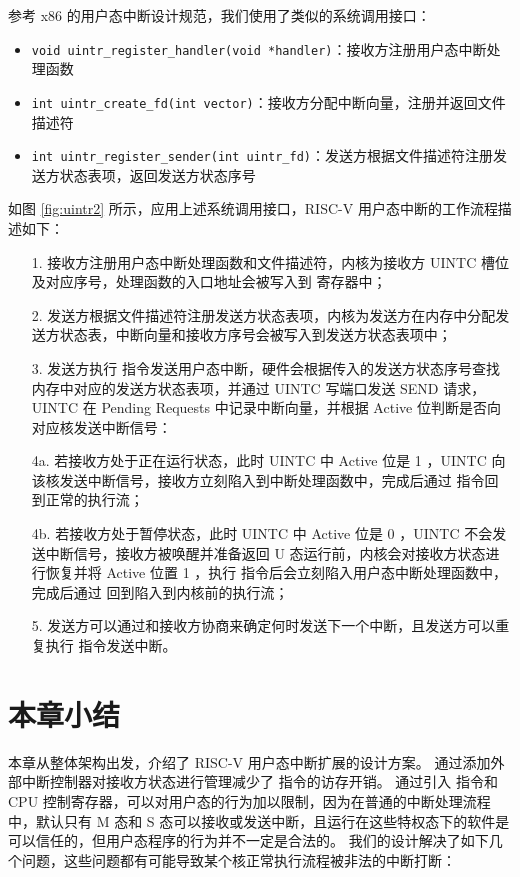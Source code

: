 参考 x86 的用户态中断设计规范\cite{x86uintr}，我们使用了类似的系统调用接口：

\begin{itemize}
    \item \texttt{void uintr_register_handler(void *handler)}：接收方注册用户态中断处理函数
    \item \texttt{int uintr_create_fd(int vector)}：接收方分配中断向量，注册并返回文件描述符
    \item \texttt{int uintr_register_sender(int uintr_fd)}：发送方根据文件描述符注册发送方状态表项，返回发送方状态序号
\end{itemize}

如图 \ref{fig:uintr2} 所示，应用上述系统调用接口，RISC-V 用户态中断的工作流程描述如下：

\begin{itemize}
    \item[1.] 接收方注册用户态中断处理函数和文件描述符，内核为接收方 UINTC 槽位及对应序号，处理函数的入口地址会被写入到 \Rutvec 寄存器中；
    \item[2.] 发送方根据文件描述符注册发送方状态表项，内核为发送方在内存中分配发送方状态表，中断向量和接收方序号会被写入到发送方状态表项中；
    \item[3.] 发送方执行 \Iuipisend 指令发送用户态中断，硬件会根据传入的发送方状态序号查找内存中对应的发送方状态表项，并通过 UINTC 写端口发送 SEND 请求，UINTC 在 Pending Requests 中记录中断向量，并根据 Active 位判断是否向对应核发送中断信号：
    \item[4a.] 若接收方处于正在运行状态，此时 UINTC 中 Active 位是 1 ，UINTC 向该核发送中断信号，接收方立刻陷入到中断处理函数中，完成后通过 \Iuret 指令回到正常的执行流；
    \item[4b.] 若接收方处于暂停状态，此时 UINTC 中 Active 位是 0 ，UINTC 不会发送中断信号，接收方被唤醒并准备返回 U 态运行前，内核会对接收方状态进行恢复并将 Active 位置 1 ，执行 \Isret 指令后会立刻陷入用户态中断处理函数中，完成后通过 \Iuret 回到陷入到内核前的执行流；
    \item[5.] 发送方可以通过和接收方协商来确定何时发送下一个中断，且发送方可以重复执行 \Iuipisend 指令发送中断。 
\end{itemize}

\section{本章小结}

本章从整体架构出发，介绍了 RISC-V 用户态中断扩展的设计方案。
通过添加外部中断控制器对接收方状态进行管理减少了 \Iuipisend 指令的访存开销。
通过引入 \Iuipi 指令和 CPU 控制寄存器，可以对用户态的行为加以限制，因为在普通的中断处理流程中，默认只有 M 态和 S 态可以接收或发送中断，且运行在这些特权态下的软件是可以信任的，但用户态程序的行为并不一定是合法的。
我们的设计解决了如下几个问题，这些问题都有可能导致某个核正常执行流程被非法的中断打断：


